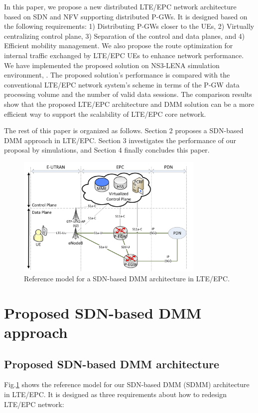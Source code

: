 \documentclass[runningheads,a4paper]{llncs}
\begin{document}
In this paper, we propose a new distributed LTE/EPC network architecture based on SDN and NFV supporting distributed P-GWs. It is designed based on the following requirements: 1) Distributing P-GWs closer to the UEs, 2) Virtually centralizing control plane, 3) Separation of the control and data planes, and 4) Efficient mobility management. We also propose the route optimization for internal traffic exchanged by LTE/EPC UEs to enhance network performance. We have implemented the proposed solution on NS3-LENA simulation environment, \cite{ref13,ref13-1}. The proposed solution's performance is compared with the conventional LTE/EPC network system's scheme in terms of the P-GW data processing volume and the number of valid data sessions. The comparison results show that the proposed LTE/EPC architecture and DMM solution can be a more efficient way to support the scalability of LTE/EPC core network.

The rest of this paper is organized as follows. Section 2 proposes a SDN-based DMM approach in LTE/EPC. Section 3 investigates the performance of our proposal by simulations, and Section 4 finally concludes this paper.

\begin{figure}[t]
\begin{center}
\includegraphics[width=9cm]{figures/fig1.pdf}
\end{center}
\caption{Reference model for a SDN-based DMM architecture in LTE/EPC.}
\label{fig:f1}
\end{figure}


\section{Proposed SDN-based DMM approach}
\subsection{Proposed SDN-based DMM architecture}
Fig.\ref{fig:f1} shows the reference model for our SDN-based DMM (SDMM) architecture in LTE/EPC. It is designed as three requirements about how to redesign LTE/EPC network:
\end{document}
